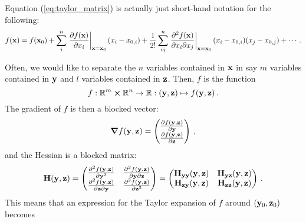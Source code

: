         Equation (\ref{eq:taylor_matrix}) is actually just short-hand notation for the following:
        \begin{equation}
            f(\vb{x}) = f(\vb{x}_0) + \sum_i^n \eval{\pdv{f(\vb{x})}{x_i}}_{\vb{x}=\vb{x}_0} (x_i - x_{0,i}) + \frac{1}{2!} \sum_{ij}^n \eval{\pdv{f(\vb{x})}{x_i}{x_j}}_{\vb{x}=\vb{x}_0} (x_i - x_{0,i}) (x_j - x_{0,j}) + \cdots \thinspace .
        \end{equation}

        Often, we would like to separate the $n$ variables contained in $\vb{x}$ in say $m$ variables contained in $\vb{y}$ and $l$ variables contained in $\vb{z}$. Then, $f$ is the function
        \begin{equation}
            f: \mathbb{R}^m \cross \mathbb{R}^n \rightarrow \mathbb{R}: (\vb{y}, \vb{z}) \mapsto f(\vb{y}, \vb{z}) \thinspace .
        \end{equation}
        The gradient of $f$ is then a blocked vector:
        \begin{equation}
            \grad{f(\vb{y}, \vb{z})} =
            \begin{pmatrix}
                \pdv{f(\vb{y}, \vb{z})}{\vb{y}} \\
                \pdv{f(\vb{y}, \vb{z})}{\vb{z}}
            \end{pmatrix}
            \thinspace ,
        \end{equation}
        and the Hessian is a blocked matrix:
        \begin{equation}
            \vb{H}(\vb{y}, \vb{z}) =
            \begin{pmatrix}
                \pdv[2]{f(\vb{y}, \vb{z})}{\vb{y}} & \pdv{f(\vb{y}, \vb{z})}{\vb{y}}{\vb{z}} \\
                \pdv{f(\vb{y}, \vb{z})}{\vb{z}}{\vb{y}} & \pdv[2]{f(\vb{y}, \vb{z})}{\vb{z}}
            \end{pmatrix}
            =
            \begin{pmatrix}
                \vb{H}_{\vb{y} \vb{y}}(\vb{y}, \vb{z}) & \vb{H}_{\vb{y} \vb{z}}(\vb{y}, \vb{z}) \\
                \vb{H}_{\vb{z} \vb{y}}(\vb{y}, \vb{z}) & \vb{H}_{\vb{z} \vb{z}}(\vb{y}, \vb{z})
            \end{pmatrix} \thinspace .
        \end{equation}
        This means that an expression for the Taylor expansion of $f$ around $(\vb{y}_0, \vb{z}_0)$ becomes
